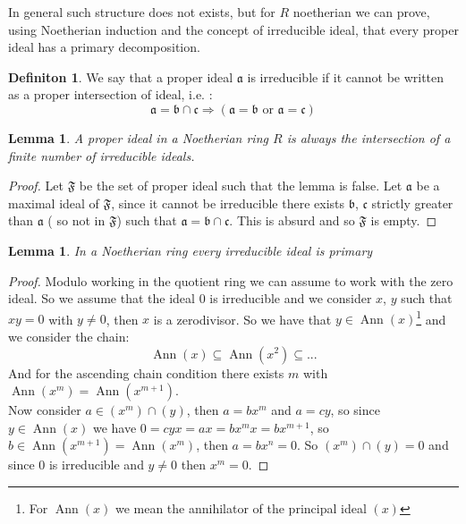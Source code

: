 \documentclass[]{article}
\theoremstyle{plain}
\newtheorem{lem}[teo]{Lemma}
\theoremstyle{remark}
\theoremstyle{definition}
\newtheorem{deff}[teo]{Definiton}
\newcommand{\A}{\mathfrak{a}}
\newcommand{\B}{\mathfrak{b}}
\newcommand{\Cc}{\mathfrak{c}}
\DeclareMathOperator{\Ann}{Ann}
\begin{document}
In general such structure does not exists, but for $ R $ noetherian we can prove, using Noetherian induction and the concept of irreducible ideal, that every proper ideal has a primary decomposition.

\begin{deff}
	We say that a proper ideal $ \A $ is irreducible if it cannot be written as a proper intersection of ideal, i.e. :
	\begin{equation*}
		\A = \B \cap \Cc \Longrightarrow (\A = \B \text{ or } \A = \Cc)
	\end{equation*}
\end{deff}

\begin{lem}
	A proper ideal in a Noetherian ring $ R $ is always the intersection of a finite number of irreducible ideals.
\end{lem}

\begin{proof}
	Let $ \mathfrak{F} $ be the set of proper ideal such that the lemma is false. Let $ \A $ be a maximal ideal of $ \mathfrak{F} $, since it cannot be irreducible there exists $ \B $, $ \Cc $ strictly greater than $ \A $ ( so not in $ \mathfrak{F} $) such that $ \A = \B \cap \Cc $. This is absurd and so $ \mathfrak{F} $ is empty.
\end{proof}

\begin{lem}
	In a Noetherian ring every irreducible ideal is primary
\end{lem}

\begin{proof}
Modulo working in the quotient ring we can assume to work with the zero ideal. So we assume that the ideal $ 0 $ is irreducible and we consider $ x$, $y $ such that $ xy = 0 $ with $ y\neq 0 $, then $ x $ is a zerodivisor. So we have that $ y \in \Ann(x) $\footnote{For $ \Ann(x) $ we mean the annihilator of the principal ideal $ (x) $} and we consider the chain:
$$ \Ann(x)  \subseteq \Ann(x^2) \subseteq ...$$
And for the ascending chain condition there exists $ m $ with $ \Ann(x^m)= \Ann(x^{m+1})$. \\
Now consider $ a \in (x^m)\cap (y) $, then $ a = bx^m $ and $ a = cy $, so since $ y \in \Ann(x) $ we have $ 0 = cyx = ax = bx^m x=  bx^{m+1}$, so $ b \in  \Ann(x^{m+1}) = \Ann(x^m) $, then $ a = bx^n = 0 $. So $ (x^m)\cap (y)=0 $ and since $ 0 $ is irreducible and $ y\neq 0 $ then $ x^m=0 $. 
\end{proof}
\end{document}
